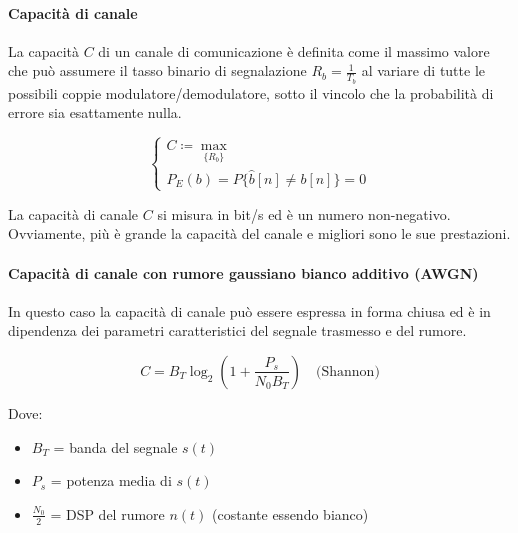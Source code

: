 \documentclass{article}
\begin{document}
\paragraph*{Capacità di canale}

La capacità \( C \) di un canale di comunicazione è definita come il massimo valore che può assumere il tasso binario di segnalazione \( R_b = \frac{1}{T_b} \) al variare di tutte le possibili coppie modulatore/demodulatore, sotto il vincolo che la probabilità di errore sia esattamente nulla.


\[
    \begin{cases} 
        C \coloneqq \max_{\{R_b\}} \\
        P_E(b) = P\{\hat{b}[n] \neq b[n]\} = 0
    \end{cases}
\]

La capacità di canale \( C \) si misura in bit/s ed è un numero non-negativo. Ovviamente, più è grande la capacità del canale e migliori sono le sue prestazioni.

\paragraph*{Capacità di canale con rumore gaussiano bianco additivo (AWGN)}

\begin{center}
\end{center}

In questo caso la capacità di canale può essere espressa in forma chiusa ed è in dipendenza dei parametri caratteristici del segnale trasmesso e del rumore.

\[
C = B_T \log_2 \left( 1 + \frac{P_s}{N_0 B_T} \right) \quad \text{(Shannon)}
\]

Dove:
\begin{itemize}
  \item \( B_T \) = banda del segnale \( s(t) \)
  \item \( P_s \) = potenza media di \( s(t) \)
  \item \( \frac{N_0}{2} \) = DSP del rumore \( n(t) \) (costante essendo bianco)
\end{itemize}
\end{document}

